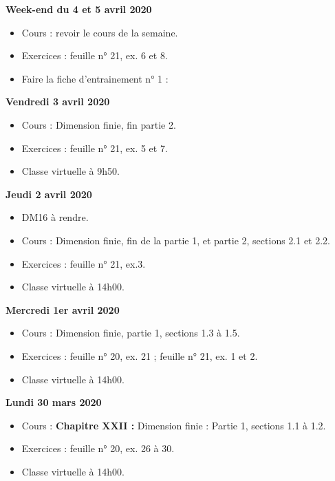 \documentclass[12pt,a4paper]{article}
\begin{document}
\noindent\textbf{Week-end du 4 et 5 avril 2020}
\begin{itemize}
\item Cours : revoir le cours de la semaine.
\item Exercices : feuille n° 21, ex. 6 et 8.
\item Faire la fiche d'entrainement n° 1 : 
\vspace{.4cm}
\end{itemize}

\noindent\textbf{\bf Vendredi 3 avril 2020}
\begin{itemize}
\item Cours : Dimension finie, fin partie 2.
\item Exercices : feuille n° 21, ex. 5 et 7.
\item Classe virtuelle à 9h50.\vspace{.4cm}
\end{itemize}

\noindent\textbf{Jeudi 2 avril 2020}
\begin{itemize}
\item DM16 à rendre.
\item Cours : Dimension finie, fin de la partie 1, et partie 2, sections 2.1 et 2.2.
\item Exercices : feuille n° 21, ex.3.
\item Classe virtuelle à 14h00.\vspace{.4cm}
\end{itemize}

\noindent\textbf{Mercredi 1er avril 2020}
\begin{itemize}
\item Cours : Dimension finie, partie 1, sections 1.3 à 1.5.
\item Exercices : feuille n° 20, ex. 21 ; feuille n° 21, ex. 1 et 2.
\item Classe virtuelle à 14h00.\vspace{.4cm}
\end{itemize}

\noindent\textbf{\bf Lundi 30 mars 2020}
\begin{itemize}
\item Cours : \textbf{Chapitre XXII :} Dimension finie : Partie 1, sections 1.1 à 1.2.
\item Exercices : feuille n° 20, ex. 26 à 30.
\item Classe virtuelle à 14h00.\vspace{.4cm}
\end{itemize}
\end{document}
